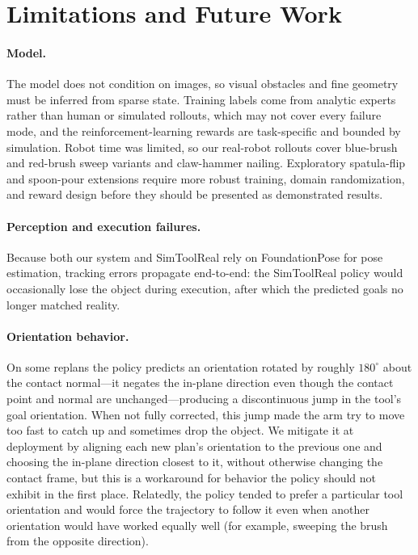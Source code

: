 \documentclass[11pt]{article}
\begin{document}
\section{Limitations and Future Work}

\paragraph{Model.}
The model does not condition on images, so visual obstacles and fine geometry must be inferred from sparse state.
Training labels come from analytic experts rather than human or simulated rollouts, which may not cover every failure mode, and the reinforcement-learning rewards are task-specific and bounded by simulation.
Robot time was limited, so our real-robot rollouts cover blue-brush and red-brush sweep variants and claw-hammer nailing.
Exploratory spatula-flip and spoon-pour extensions require more robust training, domain randomization, and reward design before they should be presented as demonstrated results.

\paragraph{Perception and execution failures.}
Because both our system and SimToolReal rely on FoundationPose for pose estimation, tracking errors propagate end-to-end: the SimToolReal policy would occasionally lose the object during execution, after which the predicted goals no longer matched reality.

\paragraph{Orientation behavior.}
On some replans the policy predicts an orientation rotated by roughly $180^\circ$ about the contact normal---it negates the in-plane direction even though the contact point and normal are unchanged---producing a discontinuous jump in the tool's goal orientation.
When not fully corrected, this jump made the arm try to move too fast to catch up and sometimes drop the object.
We mitigate it at deployment by aligning each new plan's orientation to the previous one and choosing the in-plane direction closest to it, without otherwise changing the contact frame, but this is a workaround for behavior the policy should not exhibit in the first place.
Relatedly, the policy tended to prefer a particular tool orientation and would force the trajectory to follow it even when another orientation would have worked equally well (for example, sweeping the brush from the opposite direction).
\end{document}
